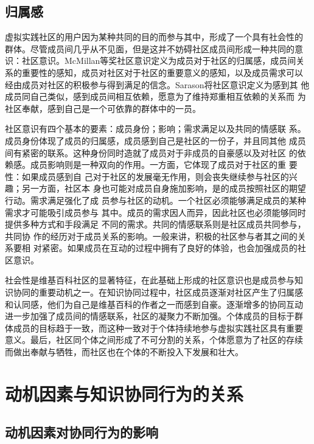 \subsection{归属感}
\label{sec:sense-of-belongings}

虚拟实践社区的用户因为某种共同的目的而参与其中，形成了一个具有社会性的
群体。尽管成员间几乎从不见面，但是这并不妨碍社区成员间形成一种共同的意
识：社区意识。McMillan等奖社区意识定义为成员对于社区的归属感，成员间关
系的重要性的感知，成员对社区对于社区的重要意义的感知，以及成员需求可以
经由成员对社区的积极参与得到满足的信念。Sarason将社区意识定义为感到其
他成员同自己类似，感到成员间相互依赖，愿意为了维持郑重相互依赖的关系而
为社区奉献，感到自己是一个可依靠的群体中的一员。

社区意识有四个基本的要素：成员身份；影响；需求满足以及共同的情感联
系。成员身份体现了成员的归属感，成员感到自己是社区的一份子，并且同其他
成员间有紧密的联系。这种身份同时造就了成员对于非成员的自豪感以及对社区
的依赖感。成员影响则是一种双向的作用。一方面，它体现了成员对于社区的重
要性：如果成员感到自
己对于社区的发展毫无作用，则会丧失继续参与社区的兴趣；另一方面，社区本
身也可能对成员自身施加影响，是的成员按照社区的期望行动。需求满足强化了成
员参与社区的动机。一个社区必须能够满足成员的某种需求才可能吸引成员参与
其中。成员的需求因人而异，因此社区也必须能够同时提供多种方式和手段满足
不同的需求。共同的情感联系则是社区成员共同参与，共同协
作的经历对于成员关系的影响。一般来讲，积极的社区参与者其之间的关系要相
对紧密。如果成员在互动的过程中拥有了良好的体验，也会加强成员的社区意识。

社会性是维基百科社区的显著特征，在此基础上形成的社区意识也是成员参与知
识协同的重要动机之一。在知识协同过程中，社区成员逐渐对社区产生了归属感
和认同感，他们为自己是维基百科的作者之一而感到自豪。逐渐增多的协同互动
进一步加强了成员间的情感联系，社区的凝聚力不断加强。个体成员的目标于群
体成员的目标趋于一致，而这种一致对于个体持续地参与虚拟实践社区具有重要
意义。最后，社区同个体之间形成了不可分割的关系，个体愿意为了社区的存续
而做出奉献与牺牲，而社区也在个体的不断投入下发展和壮大。


\section{动机因素与知识协同行为的关系}
  
\subsection{动机因素对协同行为的影响}

